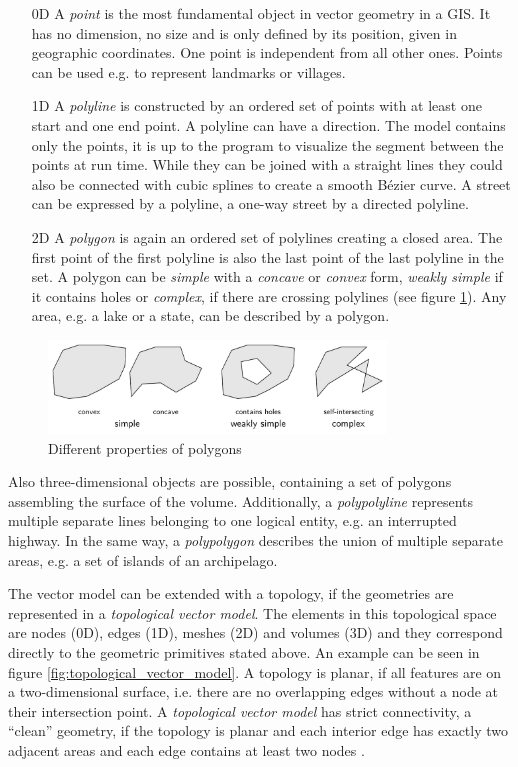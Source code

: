 \begin{enumerate}
  \item[0D] A \emph{point} is the most fundamental object in vector geometry in a GIS. It has no dimension, no size and is only defined by its position, given in geographic coordinates. One point is independent from all other ones. Points can be used e.g. to represent landmarks or villages.
  \item[1D] A \emph{polyline} is constructed by an ordered set of points with at least one start and one end point. A polyline can have a direction. The model contains only the points, it is up to the program to visualize the segment between the points at run time. While they can be joined with a straight lines they could also be connected with cubic splines to create a smooth Bézier curve. A street can be expressed by a polyline, a one-way street by a directed polyline.
  \item[2D] A \emph{polygon} is again an ordered set of polylines creating a closed area. The first point of the first polyline is also the last point of the last polyline in the set. A polygon can be \emph{simple} with a \emph{concave} or \emph{convex} form, \emph{weakly simple} if it contains holes or \emph{complex}, if there are crossing polylines (see figure \ref{fig:polygon_properties}). Any area, e.g. a lake or a state, can be described by a polygon.
\end{enumerate}

\begin{figure}[ht]
  \centering
  \includegraphics[width=0.8\textwidth]{graphics/basics/polygon_properties}
  \caption{Different properties of polygons}
  \label{fig:polygon_properties}
\end{figure}

Also three-dimensional objects are possible, containing a set of polygons assembling the surface of the volume. Additionally, a \emph{polypolyline} represents multiple separate lines belonging to one logical entity, e.g. an interrupted highway. In the same way, a \emph{polypolygon} describes the union of multiple separate areas, e.g. a set of islands of an archipelago.

The vector model can be extended with a topology, if the geometries are represented in a \emph{topological vector model}. The elements in this topological space are nodes (0D), edges (1D), meshes (2D) and volumes (3D) and they correspond directly to the geometric primitives stated above. An example can be seen in figure \ref{fig:topological_vector_model}. A topology is planar, if all features are on a two-dimensional surface, i.e. there are no overlapping edges without a node at their intersection point. A \emph{topological vector model} has strict connectivity, a ``clean'' geometry, if the topology is planar and each interior edge has exactly two adjacent areas and
each edge contains at least two nodes
\cite[pp.37-39]{bolstad2008gis}.


